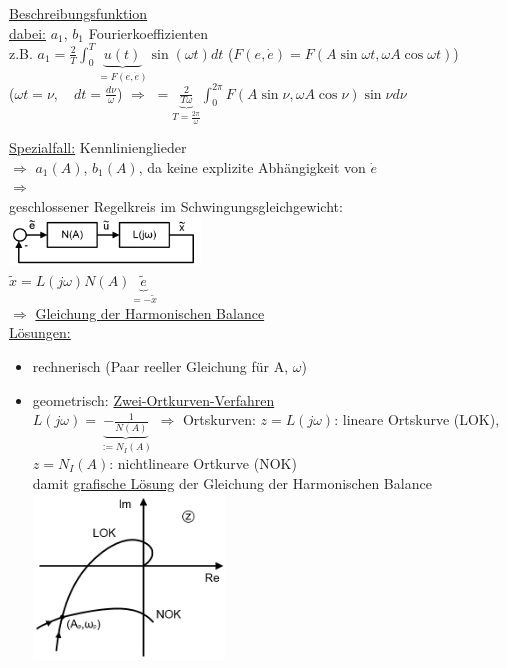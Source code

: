 \documentclass[openany,a4paper,11pt]{book}
\begin{document}
 \uline{Beschreibungsfunktion}\\
\uline{dabei:} $a_1$, $b_1$ Fourierkoeffizienten\\
z.B. $a_1=\frac{2}{T}\int_0^T \underbrace{u(t)}_{=F(e,\dot{e})}\sin{(\omega t)}dt$ \quad\quad($F(e,\dot{e})=F(A\sin{\omega t},\omega A \cos{\omega t})$)\\
($\omega t=\nu,\quad dt=\frac{d\nu}{\omega}$) $\Rightarrow$
$=\underbrace{\frac{2}{T\omega}}_{T=\frac{2\pi}{\omega}}\int_0^{2\pi}F(A\sin{\nu},\omega A\cos{\nu})\sin{\nu}d\nu$\\
\begin{minipage}[c]{\textwidth}
\end{minipage}
\uline{Spezialfall:} Kennlinienglieder\\
$\Rightarrow$ $a_1(A)$, $b_1(A)$, da keine explizite Abhängigkeit von $\dot{e}$\\
$\Rightarrow$ \\
geschlossener Regelkreis im Schwingungsgleichgewicht:\\
\includegraphics[width=2in]{imgs/NLR47.png}\\
$\tilde{x}=L(j\omega)N(A)\underbrace{\tilde{e}}_{=-\tilde{x}}$\\
$\Rightarrow$  \uline{Gleichung der Harmonischen Balance}\\
\uline{Lösungen:}
\begin{itemize}
    \item rechnerisch (Paar reeller Gleichung für A, $\omega$)
    \item geometrisch: \uline{Zwei-Ortkurven-Verfahren}\\
    $L(j\omega)=\underbrace{-\frac{1}{N(A)}}_{:=N_I(A)}$ $\Rightarrow$ Ortskurven: $z=L(j\omega)$: lineare Ortskurve (LOK), 
    $z=N_I(A)$: nichtlineare Ortkurve (NOK)\\
    damit \uline{grafische Lösung} der Gleichung der Harmonischen Balance\\
    \includegraphics[width=2in]{imgs/NLR48.png}
\end{itemize}
\end{document}
